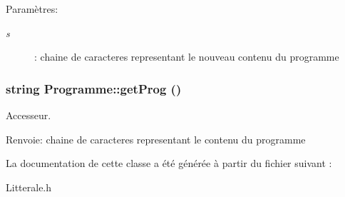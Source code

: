 \begin{Desc}
\item[Paramètres:]
\begin{description}
\item[{\em s}]: chaine de caracteres representant le nouveau contenu du programme \end{description}
\end{Desc}
\hypertarget{class_programme_640770a1987a79ee81c985966254a959}{
\subsubsection[{getProg}]{\setlength{\rightskip}{0pt plus 5cm}string Programme::getProg ()}}
\label{class_programme_640770a1987a79ee81c985966254a959}


Accesseur. 

\begin{Desc}
\item[Renvoie:]chaine de caracteres representant le contenu du programme \end{Desc}


La documentation de cette classe a été générée à partir du fichier suivant :\begin{CompactItemize}
\item 
Litterale.h\end{CompactItemize}
